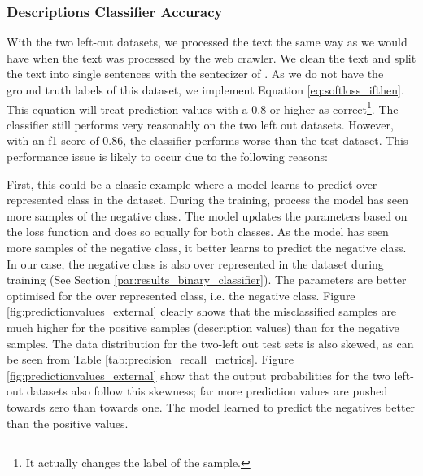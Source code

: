 \documentclass[a4paper, 12pt, oneside]{book} %
\begin{document}
\subsubsection{Descriptions Classifier Accuracy}
With the two left-out datasets, we processed the text the same way as we would have when the text was processed by the web crawler. 
We clean the text and split the text into single sentences with the sentecizer of \textcite{honnibal_spacy_2020}.
As we do not have the ground truth labels of this dataset, we implement Equation \ref{eq:softloss_ifthen}.
This equation will treat prediction values with a 0.8 or higher as correct\footnote{It actually changes the label of the sample.}.
The classifier still performs very reasonably on the two left out datasets.
However, with an f1-score of 0.86, the classifier performs worse than the test dataset.
This performance issue is likely to occur due to the following reasons:

First, this could be a classic example where a model learns to predict over-represented class in the dataset.
During the training, process the model has seen more samples of the negative class.
The model updates the parameters based on the loss function and does so equally for both classes.
As the model has seen more samples of the negative class, it better learns to predict the negative class.
In our case, the negative class is also over represented in the dataset during training (See Section \ref{par:results_binary_classifier}).
The parameters are better optimised for the over represented class, i.e. the negative class.
Figure \ref{fig:predictionvalues_external} clearly shows that the misclassified samples are much higher for the positive samples (description values) than for the negative samples. 
The data distribution for the two-left out test sets is also skewed, as can be seen from Table \ref{tab:precision_recall_metrics}.
Figure \ref{fig:predictionvalues_external} show that the output probabilities for the two left-out datasets also follow this skewness; far more prediction values are pushed towards zero than towards one.
The model learned to predict the negatives better than the positive values.
\end{document}
